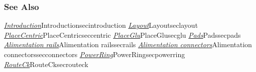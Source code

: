 \begin{htmlonly}

\subsubsection{See Also}

\hyperref[ref]{\emph{Introduction}}{}{Introduction}{secintroduction}
\hyperref[ref]{\emph{Layout}}{}{Layout}{seclayout}
\hyperref[ref]{\emph{PlaceCentric}}{}{PlaceCentric}{seccentric}
\hyperref[ref]{\emph{PlaceGlu}}{}{PlaceGlu}{secglu}
\hyperref[ref]{\emph{Pads}}{}{Pads}{secpads}
\hyperref[ref]{\emph{Alimentation rails}}{}{Alimentation rails}{secrails}
\hyperref[ref]{\emph{Alimentation connectors}}{}{Alimentation connectors}{secconnectors}
\hyperref[ref]{\emph{PowerRing}}{}{PowerRing}{secpowerring}
\hyperref[ref]{\emph{RouteCk}}{}{RouteCk}{secrouteck}

\end{htmlonly}
